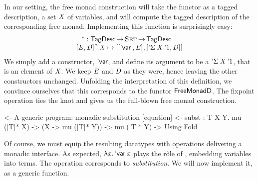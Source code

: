 In our setting, the free monad construction will take the functor as a
tagged description, a set $\V{X}$ of variables, and will compute the
tagged description of the corresponding free monad. Implementing this
function is surprisingly easy:
%
\[\stk{
\FreeMonad{\_} : \TagDesc \To \Set \To \TagDesc \\
\FreeMonad{\pair{\V{E}}{\V{D}}{}}\:\V{X} \mapsto
    \pair{\pair{\DVar{}}{\V{E}}{}}
         {\pair{\DSigma{\V{X}}{\DUnit}}{\V{D}}{}}{}
}\]
%
We simply add a constructor, $\SYMBDVar$, and define its argument to
be a $\DSigma{\V{X}}{\DUnit}$, that is an element of $\V{X}$. We keep
$\V{E}$ and $\V{D}$ as they were, hence leaving the other constructors
unchanged. Unfolding the interpretation of this definition, we
convince ourselves that this corresponds to the functor
$\FMFreeMonadD$. The fixpoint operation ties the knot and gives us
the full-blown free monad construction.

\begin{wstructure}
<- A generic program: monadic substitution [equation]
    <- subst : \forall T X Y. mu ([T]* X) -> (X -> mu ([T]* Y)) -> mu ([T]* Y)
        -> Using Fold
\end{wstructure}

Of course, we must equip the resulting datatypes with operations
delivering a monadic interface. As expected, \(\LAM{\x}\DVar{\x}\)
plays the r\^ole of \return, embedding variables into terms. The
\bind operation corresponds to \emph{substitution}. We will now
implement it, as a generic function.


\newcommand{\subst}{\F{subst}}
\newcommand{\apply}{\F{apply}}

